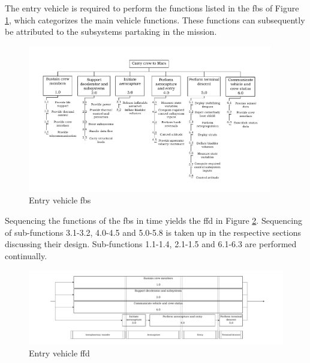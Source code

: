The entry vehicle is required to perform the functions listed in the \acrfull{fbs} of Figure \ref{fig:fbs}, which categorizes the main vehicle functions. These functions can subsequently be attributed to the subsystems partaking in the mission.
\begin{figure}[h]
	\includegraphics[width=0.95\textwidth]{./Figure/subsystem_breakdown/FBS.pdf}
	\caption{Entry vehicle \acrfull{fbs}}
	\label{fig:fbs}
\end{figure}
Sequencing the functions of the \gls{fbs} in time yields the \acrfull{ffd} in Figure \ref{fig:ffd}. Sequencing of sub-functions 3.1-3.2, 4.0-4.5 and 5.0-5.8 is taken up in the respective sections discussing their design. Sub-functions 1.1-1.4, 2.1-1.5 and 6.1-6.3 are performed continually.
\begin{figure}[h]
	\includegraphics[width=1.00\textwidth]{./Figure/subsystem_breakdown/FFD.pdf}
	\caption{Entry vehicle \acrfull{ffd}}
	\label{fig:ffd}
\end{figure}



